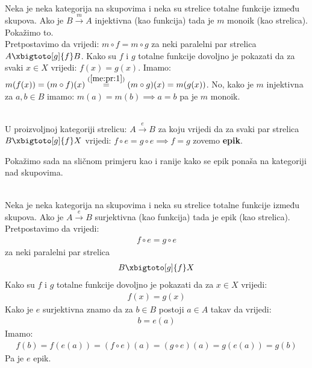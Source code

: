 \begin{example}\ \\

    \noindent Neka je  neka kategorija na skupovima i neka su strelice
    totalne funkcije između skupova.
    Ako je $B \xrightarrow{m} A$ injektivna (kao funkcija) tada je $m$ monoik (kao
    strelica). Pokažimo to.\\    
    \noindent Pretpostavimo da vrijedi: $ m \circ f = m \circ g$ \label{me:pr:1}
    za neki paralelni par strelica $A \xbigtoto[g]{f} B$. Kako su $f$ i $g$ totalne funkcije dovoljno je pokazati da za svaki $x \in X$ vrijedi: $f(x) = g(x)$. Imamo:
     $m(f(x)) = (m \circ f)(x) \overset{(\ref{me:pr:1})}{=} (m \circ g)(x) = m(g(x))$.
    No, kako je $m$ injektivna za $a, b \in B$ imamo:
     $m(a) = m(b) \implies a = b$
   	pa je $m$ monoik.\\
\end{example}

  \begin{definition}\ \\
  
    \noindent U proizvoljnoj kategoriji  strelicu: $A \xrightarrow{e} B$ za koju vrijedi da za svaki par strelica $B \xbigtoto[g]{f} X$ vrijedi: $f \circ e = g \circ e \implies f = g$ zovemo \textbf{epik}.
  \end{definition}
  
  Pokažimo sada na sličnom primjeru kao i ranije kako se epik ponaša na
  kategoriji nad skupovima.

\begin{example}\ \\
	
	\noindent Neka je  neka kategorija na skupovima i neka su strelice
    totalne funkcije između skupova.
    Ako je $A \xrightarrow{e} B$ surjektivna (kao funkcija) tada je epik (kao
    strelica).
    Pretpostavimo da vrijedi:
    \begin{align*} \label{me:pr:2}
      f \circ e = g \circ e
    \end{align*}
    za neki paralelni par strelica
    \begin{align*}
      B \xbigtoto[g]{f} X
    \end{align*}
    Kako su $f$ i $g$ totalne funkcije dovoljno je pokazati da za $x \in X$
    vrijedi:
    \begin{align*}
      f(x) = g(x)
    \end{align*}
    Kako je $e$ surjektivna znamo da za $b \in B$ postoji $a \in A$ takav da
    vrijedi:
    \begin{align*}
      b = e(a)
    \end{align*}
    Imamo:
    \begin{align*}
      f(b) = f(e(a)) = (f \circ e)(a) = (g \circ e)(a) = g(e(a)) = g(b)
    \end{align*}
    Pa je $e$ epik.\\
\end{example}

